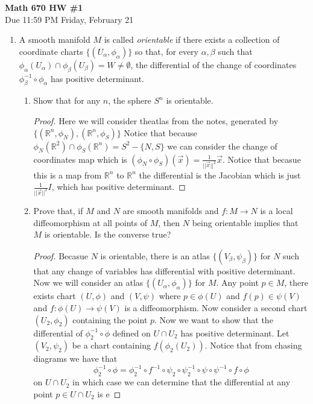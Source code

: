\documentclass[11pt]{article}
\theoremstyle{definition}
\theoremstyle{definition}
\newcommand{\R}{{\mathbb R}}
\begin{document}
\begin{center}
{\Large\textbf{Math 670 HW \#1}}\\
Due 11:59 PM Friday, February 21
\end{center}




\begin{enumerate}	
	
	\item A smooth manifold $M$ is called \emph{orientable} if there exists a collection of coordinate 
    charts $\{(U_\alpha, \phi_\alpha)\}$ so that, for every $\alpha, \beta$ such that 
    $\phi_\alpha(U_\alpha) \cap \phi_\beta(U_\beta) = W \neq \emptyset$, the differential of the change of 
    coordinates $\phi_\beta^{-1} \circ \phi_\alpha$ has positive determinant.
	
	\begin{enumerate}
		\item Show that for any $n$, the sphere $S^n$ is orientable.
		\begin{proof}
            Here we will consider theatlas from the notes, generated by $\{(\R^n,\phi_N),(\R^n,\phi_S)\}$
            Notice that because $\phi_N(\R^2)\cap\phi_S(\R^n)=S^2-\{N,S\}$ we can consider the change of coordinates 
            map which is $(\phi_N\circ \phi_S)(\vec{x})=\frac{1}{||\vec x||^2}\vec x$.
            Notice that becasue this is a map from $\R^n$ to $\R^n$ the differential is the Jacobian 
            which is just $\frac{1}{||\vec x||^2}I$, which has positive determinant.

        \end{proof}		
		\item Prove that, if $M$ and $N$ are smooth manifolds and $f: M \to N$ is a local diffeomorphism at all points of $M$, then $N$ being orientable implies that $M$ is orientable. Is the converse true?
        \begin{proof}
            Becasue $N$ is orientable, there is an atlas $\{(V_\beta,\psi_\beta)\}$ for $N$ such that any change of variables has differential with 
            positive determinant. 
            Now we will consider an atlas $\{(U_\alpha,\phi_\alpha)\}$ for $M$.
            Any point $p\in M$, there exists chart $(U,\phi)$ and $(V,\psi)$ where $p\in\phi(U)$ and $f(p)\in\psi(V)$ and $f:\phi(U)\rightarrow\psi(V)$ is a diffeomorphism.
            Now consider a second chart $(U_2,\phi_2)$ containing the point $p$. Now we want to show that the differential of
            $\phi_2^{-1}\circ\phi$ defined on $U\cap U_2$ 
            has positive determinant. 
            Let $(V_2,\psi_2)$ be a chart containing $f(\phi_2(U_2))$. Notice that from chasing diagrams we have that 
            \[\phi_2^{-1}\circ\phi=\phi_2^{-1}\circ f^{-1} \circ \psi_2\circ\psi_2^{-1}\circ\psi\circ\psi^{-1}\circ f \circ\phi\]
            on $U\cap U_2$ in which case we can determine that the differential at any point $p\in U\cap U_2$ is
            e 





\end{proof}
\end{enumerate}
\end{enumerate}
\end{document}
